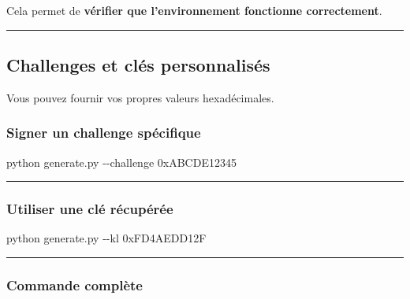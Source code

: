 \documentclass[
  french,
]{article}
\newenvironment{Shaded}{\begin{snugshade}}{\end{snugshade}}
\newcommand{\AttributeTok}[1]{\textcolor[rgb]{0.13,0.29,0.53}{#1}}
\newcommand{\ExtensionTok}[1]{#1}
\newcommand{\NormalTok}[1]{#1}
\begin{document}
Cela permet de \textbf{vérifier que l'environnement fonctionne
correctement}.

\begin{center}\rule{0.5\linewidth}{0.5pt}\end{center}

\subsection{Challenges et clés
personnalisés}\label{challenges-et-cluxe9s-personnalisuxe9s}

Vous pouvez fournir vos propres valeurs hexadécimales.

\subsubsection{Signer un challenge
spécifique}\label{signer-un-challenge-spuxe9cifique}

\begin{Shaded}
\begin{Highlighting}[]
\ExtensionTok{python}\NormalTok{ generate.py }\AttributeTok{{-}{-}challenge}\NormalTok{ 0xABCDE12345}
\end{Highlighting}
\end{Shaded}

\begin{center}\rule{0.5\linewidth}{0.5pt}\end{center}

\subsubsection{Utiliser une clé
récupérée}\label{utiliser-une-cluxe9-ruxe9cupuxe9ruxe9e}

\begin{Shaded}
\begin{Highlighting}[]
\ExtensionTok{python}\NormalTok{ generate.py }\AttributeTok{{-}{-}kl}\NormalTok{ 0xFD4AEDD12F}
\end{Highlighting}
\end{Shaded}

\begin{center}\rule{0.5\linewidth}{0.5pt}\end{center}

\subsubsection{Commande complète}\label{commande-compluxe8te}
\end{document}
